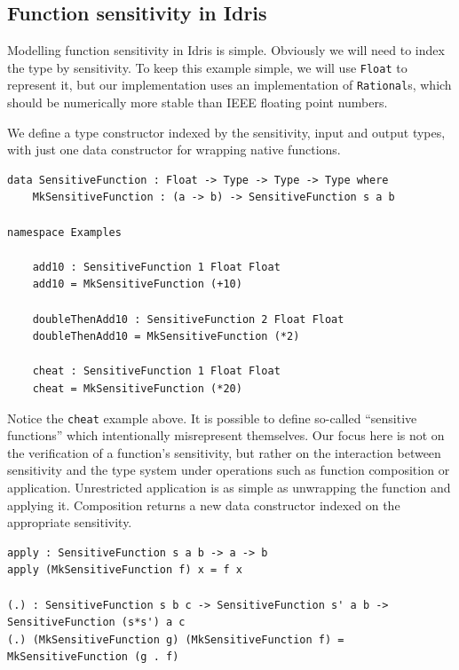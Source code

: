 \documentclass[12pt]{article}
\begin{document}

\subsection{Function sensitivity in Idris}

Modelling function sensitivity in Idris is simple.
Obviously we will need to index the type by sensitivity.
To keep this example simple, we will use \texttt{Float} to represent it, but our implementation uses an implementation of \texttt{Rational}s, which should be numerically more stable than IEEE floating point numbers.

We define a type constructor indexed by the sensitivity, input and output types, with just one data constructor for wrapping native functions.

\begin{lstlisting}
data SensitiveFunction : Float -> Type -> Type -> Type where
    MkSensitiveFunction : (a -> b) -> SensitiveFunction s a b

namespace Examples

    add10 : SensitiveFunction 1 Float Float
    add10 = MkSensitiveFunction (+10)

    doubleThenAdd10 : SensitiveFunction 2 Float Float
    doubleThenAdd10 = MkSensitiveFunction (*2)

    cheat : SensitiveFunction 1 Float Float
    cheat = MkSensitiveFunction (*20)
\end{lstlisting}

Notice the \texttt{cheat} example above.
It is possible to define so-called ``sensitive functions'' which intentionally misrepresent themselves.
Our focus here is not on the verification of a function's sensitivity, but rather on the interaction between sensitivity and the type system under operations such as function composition or application.
Unrestricted application is as simple as unwrapping the function and applying it.
Composition returns a new data constructor indexed on the appropriate sensitivity.

\begin{lstlisting}
apply : SensitiveFunction s a b -> a -> b
apply (MkSensitiveFunction f) x = f x

(.) : SensitiveFunction s b c -> SensitiveFunction s' a b -> SensitiveFunction (s*s') a c
(.) (MkSensitiveFunction g) (MkSensitiveFunction f) = MkSensitiveFunction (g . f)
\end{lstlisting}
\end{document}
